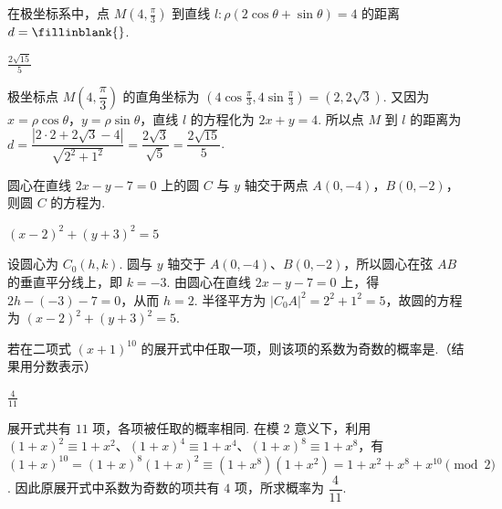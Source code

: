 \begin{problem}
在极坐标系中，点 \(M\left(4, \frac{\pi}{3}\right)\) 到直线 \(l: \rho(2\cos\theta + \sin\theta) = 4\) 的距离 \(d =\fillinblank{}\).
\end{problem}

\begin{answer}
\(\frac{2\sqrt{15}}{5}\)
\end{answer}

\begin{solution}
极坐标点 \(M\left(4,\dfrac{\pi}{3}\right)\) 的直角坐标为 \((4\cos\frac{\pi}{3},4\sin\frac{\pi}{3})=(2,2\sqrt{3})\). 又因为 \(x=\rho\cos\theta\)，\(y=\rho\sin\theta\)，直线 \(l\) 的方程化为 \(2x+y=4\). 所以点 \(M\) 到 \(l\) 的距离为
\(d=\dfrac{|2\cdot2+2\sqrt{3}-4|}{\sqrt{2^{2}+1^{2}}}=\dfrac{2\sqrt{3}}{\sqrt{5}}=\dfrac{2\sqrt{15}}{5}\).
\end{solution}

\begin{problem}
圆心在直线 \(2x - y - 7 = 0\) 上的圆 \(C\) 与 \(y\) 轴交于两点 \(A(0, -4)\)，\(B(0, -2)\)，则圆 \(C\) 的方程为\fillinblank{}.

\end{problem}

\begin{answer}
\(\left(x-2\right)^2+\left(y+3\right)^2=5\)
\end{answer}

\begin{solution}
设圆心为 \(C_{0}(h,k)\). 圆与 \(y\) 轴交于 \(A(0,-4)\)、\(B(0,-2)\)，所以圆心在弦 \(AB\) 的垂直平分线上，即 \(k=-3\). 由圆心在直线 \(2x-y-7=0\) 上，得 \(2h-(-3)-7=0\)，从而 \(h=2\). 半径平方为 \(\left|C_{0}A\right|^{2}=2^{2}+1^{2}=5\)，故圆的方程为 \(\left(x-2\right)^{2}+\left(y+3\right)^{2}=5\).
\end{solution}

\begin{problem}
若在二项式 \((x + 1)^{10}\) 的展开式中任取一项，则该项的系数为奇数的概率是\fillinblank{}.（结果用分数表示）
\end{problem}

\begin{answer}
\(\frac{4}{11}\)
\end{answer}

\begin{solution}
展开式共有 \(11\) 项，各项被任取的概率相同. 在模 \(2\) 意义下，利用
\((1+x)^{2}\equiv1+x^{2}\)、\((1+x)^{4}\equiv1+x^{4}\)、\((1+x)^{8}\equiv1+x^{8}\)，有
\((1+x)^{10}=(1+x)^{8}(1+x)^{2}\equiv(1+x^{8})(1+x^{2})=1+x^{2}+x^{8}+x^{10}\pmod2\).
因此原展开式中系数为奇数的项共有 \(4\) 项，所求概率为 \(\dfrac{4}{11}\).
\end{solution}

